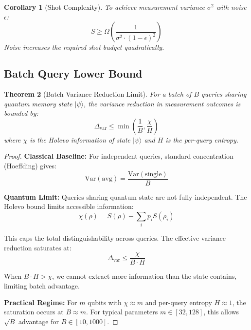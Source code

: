 \documentclass[11pt,letterpaper]{article}
\newtheorem{theorem}{Theorem}
\newtheorem{corollary}[theorem]{Corollary}
\begin{document}
\begin{corollary}[Shot Complexity]
\label{cor:shot_complexity}
To achieve measurement variance $\sigma^2$ with noise $\epsilon$:
\begin{equation}
S \geq \Omega\left(\frac{1}{\sigma^2 \cdot (1-\epsilon)^2}\right)
\end{equation}
Noise increases the required shot budget quadratically.
\end{corollary}

\subsection{Batch Query Lower Bound}

\begin{theorem}[Batch Variance Reduction Limit]
\label{thm:batch_limit}
For a batch of $B$ queries sharing quantum memory state $|\psi\rangle$, the variance reduction in measurement outcomes is bounded by:
\begin{equation}
\Delta_{\text{var}} \leq \min\left(\frac{1}{B}, \frac{\chi}{H}\right)
\end{equation}
where $\chi$ is the Holevo information of state $|\psi\rangle$ and $H$ is the per-query entropy.
\end{theorem}

\begin{proof}
\textbf{Classical Baseline:} For independent queries, standard concentration (Hoeffding) gives:
\begin{equation}
\text{Var}(\text{avg}) = \frac{\text{Var}(\text{single})}{B}
\end{equation}

\textbf{Quantum Limit:} Queries sharing quantum state are not fully independent. The Holevo bound limits accessible information:
\begin{equation}
\chi(\rho) = S(\rho) - \sum_i p_i S(\rho_i)
\end{equation}

This caps the total distinguishability across queries. The effective variance reduction saturates at:
\begin{equation}
\Delta_{\text{var}} \leq \frac{\chi}{B \cdot H}
\end{equation}

When $B \cdot H > \chi$, we cannot extract more information than the state contains, limiting batch advantage.

\textbf{Practical Regime:} For $m$ qubits with $\chi \approx m$ and per-query entropy $H \approx 1$, the saturation occurs at $B \approx m$. For typical parameters $m \in [32, 128]$, this allows $\sqrt{B}$ advantage for $B \in [10, 1000]$.
\end{proof}
\end{document}
